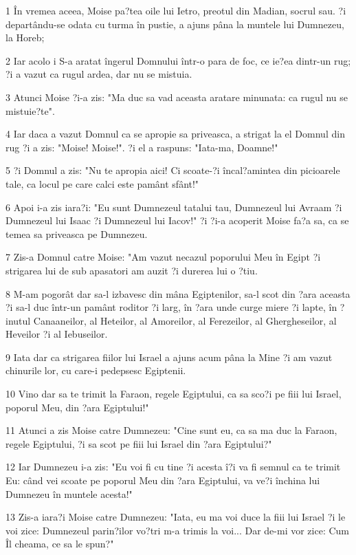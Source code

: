 \par 1 În vremea aceea, Moise pa?tea oile lui Ietro, preotul din Madian, socrul sau. ?i departându-se odata cu turma în pustie, a ajuns pâna la muntele lui Dumnezeu, la Horeb;
\par 2 Iar acolo i S-a aratat îngerul Domnului într-o para de foc, ce ie?ea dintr-un rug; ?i a vazut ca rugul ardea, dar nu se mistuia.
\par 3 Atunci Moise ?i-a zis: "Ma duc sa vad aceasta aratare minunata: ca rugul nu se mistuie?te".
\par 4 Iar daca a vazut Domnul ca se apropie sa priveasca, a strigat la el Domnul din rug ?i a zis: "Moise! Moise!". ?i el a raspuns: "Iata-ma, Doamne!"
\par 5 ?i Domnul a zis: "Nu te apropia aici! Ci scoate-?i încal?amintea din picioarele tale, ca locul pe care calci este pamânt sfânt!"
\par 6 Apoi i-a zis iara?i: "Eu sunt Dumnezeul tatalui tau, Dumnezeul lui Avraam ?i Dumnezeul lui Isaac ?i Dumnezeul lui Iacov!" ?i ?i-a acoperit Moise fa?a sa, ca se temea sa priveasca pe Dumnezeu.
\par 7 Zis-a Domnul catre Moise: "Am vazut necazul poporului Meu în Egipt ?i strigarea lui de sub apasatori am auzit ?i durerea lui o ?tiu.
\par 8 M-am pogorât dar sa-l izbavesc din mâna Egiptenilor, sa-l scot din ?ara aceasta ?i sa-l duc într-un pamânt roditor ?i larg, în ?ara unde curge miere ?i lapte, în ?inutul Canaaneilor, al Heteilor, al Amoreilor, al Ferezeilor, al Ghergheseilor, al Heveilor ?i al Iebuseilor.
\par 9 Iata dar ca strigarea fiilor lui Israel a ajuns acum pâna la Mine ?i am vazut chinurile lor, cu care-i pedepsesc Egiptenii.
\par 10 Vino dar sa te trimit la Faraon, regele Egiptului, ca sa sco?i pe fiii lui Israel, poporul Meu, din ?ara Egiptului!"
\par 11 Atunci a zis Moise catre Dumnezeu: "Cine sunt eu, ca sa ma duc la Faraon, regele Egiptului, ?i sa scot pe fiii lui Israel din ?ara Egiptului?"
\par 12 Iar Dumnezeu i-a zis: "Eu voi fi cu tine ?i acesta î?i va fi semnul ca te trimit Eu: când vei scoate pe poporul Meu din ?ara Egiptului, va ve?i închina lui Dumnezeu în muntele acesta!"
\par 13 Zis-a iara?i Moise catre Dumnezeu: "Iata, eu ma voi duce la fiii lui Israel ?i le voi zice: Dumnezeul parin?ilor vo?tri m-a trimis la voi... Dar de-mi vor zice: Cum Îl cheama, ce sa le spun?"
